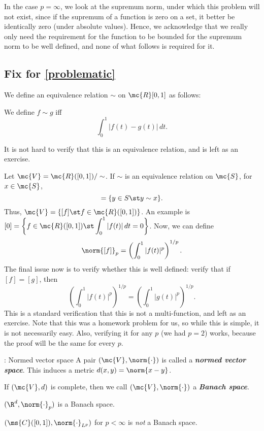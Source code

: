 \begin{note}[\(p=\infty\) case.]
    In the case \(p=\infty\), we look at the supremum norm, under which this problem will not exist, since if the supremum of a function is zero on a set, it better be identically zero (under absolute values). Hence, we acknowledge that we really only need the requirement for the function to be bounded for the supremum norm to be well defined, and none of what follows is required for it.
\end{note}
\subsection{Fix for \cref{problematic}}
We define an equivalence relation \(\sim\) on \(\mc{R}[0,1]\) as follows:

\begin{ndef}{}
    We define \(f\sim g\) iff
    \begin{equation*} 
        \int_0^1 |f(t)-g(t)| \, dt.
    \end{equation*}
\end{ndef}
It is not hard to verify that this is an equivalence relation, and is left as an exercise.

\medskip

Let \(\mc{V}=\mc{R}([0,1])/\sim\). If \(\sim\) is an equivalence relation on \(\mc{S}\), for \(x\in\mc{S}\),
\begin{equation*} 
    [x]=\{y\in S\st y\sim x\}.
\end{equation*}
Thus, \(\mc{V}=\{[f]\st f\in\mc{R}([0,1])\}\). An example is \([0]=\displaystyle\left\{f\in\mc{R}([0,1])\st \int_0^1 |f(t)| \, dt=0\right\}\). Now, we can define 
\begin{equation*} 
    \norm{[f]}_p=\left(\int_0^1 |f(t)|^p\right)^{1/p}.
\end{equation*}
The final issue now is to verify whether this is well defined: verify that if \([f]=[g]\), then 
\begin{equation*} 
    \left(\int_0^1 |f(t)|^p\right)^{1/p}=\left(\int_0^1 |g(t)|^p\right)^{1/p}.
\end{equation*}
This is a standard verification that this is not a multi-function, and left as an exercise. Note that this was a homework problem for us, so while this is simple, it is not necessarily easy. Also, verifying it for any \(p\) (we had \(p=2\)) works, because the proof will be the same for every \(p\).

\begin{ndef}{: Normed vector space}
    A pair \((\mc{V},\norm{\cdot})\) is called a \emph{\textbf{normed vector space}}. This induces a metric \(d(x,y)=\norm{x-y}\).

    \medskip

    If \((\mc{V},d)\) is complete, then we call \((\mc{V},\norm{\cdot})\) a \emph{\textbf{Banach space}}.
\end{ndef}
\begin{example}
    \((\R^d,\norm{\cdot}_p)\) is a Banach space.
\end{example}
\begin{example}
    \((\ms{C}([0,1]),\norm{\cdot}_{L^p})\) for \(p<\infty\) is \emph{not} a Banach space.
\end{example}

